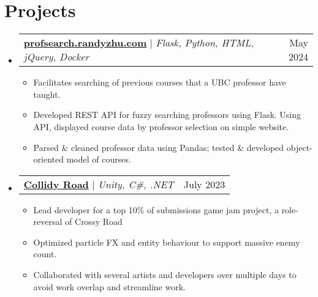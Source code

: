 \documentclass[letterpaper,11pt]{article}
\makeatletter
\newcommand{\resumeItem}[1]{
  \item\small{
    {#1 \vspace{-2pt}}
  }
}
\newcommand{\resumeProjectHeading}[2]{
    \item
    \begin{tabular*}{0.97\textwidth}{l@{\extracolsep{\fill}}r}
      \small#1 & #2 \\
    \end{tabular*}\vspace{-7pt}
}
\newcommand{\resumeSubHeadingListStart}{\begin{itemize}[leftmargin=0.15in, label={}]}
\newcommand{\resumeSubHeadingListEnd}{\end{itemize}}
\newcommand{\resumeItemListStart}{\begin{itemize}}
\newcommand{\resumeItemListEnd}{\end{itemize}\vspace{-5pt}}
\makeatother
\begin{document}
\section{Projects}
\resumeSubHeadingListStart

\resumeProjectHeading
{\href{https://profsearch.randyzhu.com/}{\textbf{profsearch.randyzhu.com}} $|$ \emph{Flask, Python, HTML, jQuery, Docker}}{May 2024}
\resumeItemListStart
\resumeItem{Facilitates searching of previous courses that a UBC professor have taught.}
\resumeItem{Developed REST API for fuzzy searching professors using Flask. Using API, displayed course data by professor selection on simple website.}
\resumeItem{Parsed \& cleaned professor data using Pandas; tested \& developed object-oriented model of courses.}
\resumeItemListEnd

\resumeProjectHeading
{\href{https://itch.io/jam/gmtk-2023/rate/2157338?after=0}{\textbf{Collidy Road}} $|$ \emph{Unity, C\#, .NET}}{July 2023}
\resumeItemListStart
\resumeItem{Lead developer for a top 10\% of submissions game jam project, a role-reversal of Crossy Road}
\resumeItem{Optimized particle FX and entity behaviour to support massive enemy count.}
\resumeItem{Collaborated with several artists and developers over multiple days to avoid work overlap and streamline work.}
\resumeItemListEnd



\resumeSubHeadingListEnd


\end{document}
